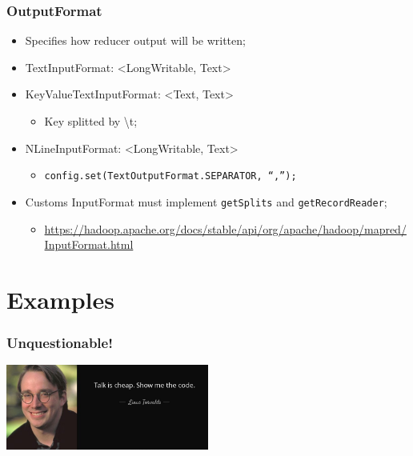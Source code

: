 \documentclass[aspectratio=169]{beamer}
\begin{document}
\begin{frame}
	\frametitle{OutputFormat}

	\begin{itemize}
		\item Specifies how reducer output will be written;
		\item TextInputFormat: <LongWritable, Text>
		\item KeyValueTextInputFormat: <Text, Text>
		      \begin{itemize}
			      \item Key splitted by \textbackslash t;
		      \end{itemize}
		\item NLineInputFormat: <LongWritable, Text>
		      \begin{itemize}
			      \item {\scriptsize \texttt{config.set(TextOutputFormat.SEPARATOR, ``,'');}}
		      \end{itemize}
		\item Customs InputFormat must implement \texttt{getSplits} and \texttt{getRecordReader};
		      \begin{itemize}
			      \item {\tiny \href{https://hadoop.apache.org/docs/stable/api/org/apache/hadoop/mapred/InputFormat.html}{https://hadoop.apache.org/docs/stable/api/org/apache/hadoop/mapred/InputFormat.html}}
		      \end{itemize}
	\end{itemize}
\end{frame}

\section{Examples}

\begin{frame}
	\frametitle{Unquestionable!}

	\begin{center}
		\includegraphics[height=1\textheight,width=0.5\textwidth,keepaspectratio]{./images/show-me-the-code.jpg}
	\end{center}
\end{frame}
\end{document}
